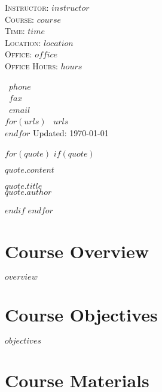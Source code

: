 \documentclass[$fontsize$, letterpaper]{article}
\begin{document}

\begin{minipage}[t]{2.95in}
 \flushleft \footnotesize \textsc{Instructor:} $instructor$\\ \textsc{Course:}
 $course$\\ \textsc{Time:} $time$\\ \textsc{Location:} $location$\\
 \textsc{Office:} $office$\\ \textsc{Office Hours:} $hours$
\end{minipage}
\hfill
\hfill
\begin{minipage}[t]{1.7in}
  \flushright \footnotesize {} ~$phone$\\ \Faxmachine ~$fax$\\  ~$email$\\ $for(urls)$  ~$urls$\\ $endfor$
  Updated: \today
\end{minipage}

\bigskip


$for(quote)$
$if(quote)$
\bigskip
\epigraph{$quote.content$}{$quote.title$\\\textsc{$quote.author$}}
\smallskip
$endif$
$endfor$

\section*{Course Overview}

$overview$

\section*{Course Objectives}

$objectives$

\section*{Course Materials}
\end{document}
